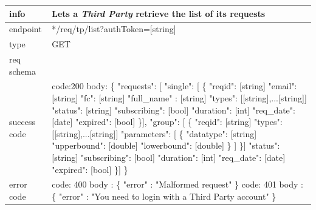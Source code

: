 \documentclass[titlepage]{article}
\begin{document}
	\begin{tabularx}{\textwidth}{lX} \hline
		info & Lets a {\it Third Party} retrieve the list of its requests \\ \hline
		endpoint & */req/tp/list?authToken=[string] \\ \hline
		type & GET \\ \hline
		req schema & \\ \hline
		success code & code:200
		body: \{ \newline
		"requests": [ \newline
		"single": [ \newline
		\{ \newline
		"reqid": [string] \newline
		"email": [string] \newline
		"fc": [string] \newline
		"full\_name" : [string] \newline
		"types": [[string],...[string]] \newline
		"status": [string] \newline
		"subscribing": [bool] \newline
		"duration": [int] \newline
		"req\_date": [date] \newline
		"expired": [bool] \newline
		\}], \newline
		"group": [ \newline
		\{ \newline
		"reqid": [string] \newline
		"types": [[string],...[string]] \newline
		"parameters": [ \newline
		\{ \newline
		"datatype": [string] \newline
		"upperbound": [double] \newline
		"lowerbound": [double] \newline
		\} \newline
		] \newline
		\}] \newline
		"status": [string] \newline
		"subscribing": [bool] \newline
		"duration": [int] \newline
		"req\_date": [date] \newline
		"expired": [bool] \newline
		\}] \newline
		\} \\ \hline
		error code &
		code: 400 \newline
		body : \{ "error" : "Malformed request" \} \newline \newline
		code: 401 \newline
		body : \{ "error" : "You need to login with a Third Party account" \}\\ \hline
	\end{tabularx}
	
\end{document}
